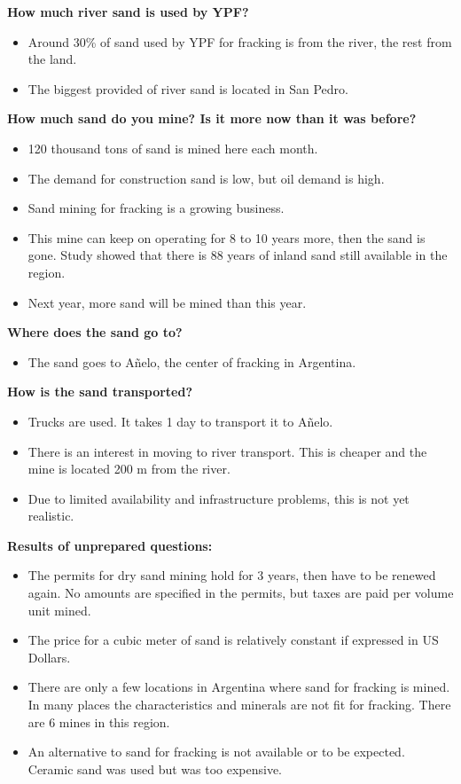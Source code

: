 \textbf{How much river sand is used by YPF?}
\begin{itemize}
    \item Around 30\% of sand used by YPF for fracking is from the river, the rest from the land.
    \item The biggest provided of river sand is located in San Pedro.
\end{itemize}

\textbf{How much sand do you mine? Is it more now than it was before?}
\begin{itemize}
    \item 120 thousand tons of sand is mined here each month.
    \item The demand for construction sand is low, but oil demand is high.
    \item Sand mining for fracking is a growing business.
    \item This mine can keep on operating for 8 to 10 years more, then the sand is gone. Study showed that there is 88 years of inland sand still available in the region.
    \item Next year, more sand will be mined than this year.
\end{itemize}

\textbf{Where does the sand go to?}
\begin{itemize}
    \item The sand goes to Añelo, the center of fracking in Argentina.
\end{itemize}

\textbf{How is the sand transported?}
\begin{itemize}
    \item Trucks are used. It takes 1 day to transport it to Añelo.
    \item There is an interest in moving to river transport. This is cheaper and the mine is located 200 m from the river.
    \item Due to limited availability and infrastructure problems, this is not yet realistic.
\end{itemize}

\textbf{Results of unprepared questions:}
\begin{itemize}
    \item The permits for dry sand mining hold for 3 years, then have to be renewed again. No amounts are specified in the permits, but taxes are paid per volume unit mined.
    \item The price for a cubic meter of sand is relatively constant if expressed in US Dollars.
    \item There are only a few locations in Argentina where sand for fracking is mined. In many places the characteristics and minerals are not fit for fracking. There are 6 mines in this region.
    \item An alternative to sand for fracking is not available or to be expected. Ceramic sand was used but was too expensive.
\end{itemize}

